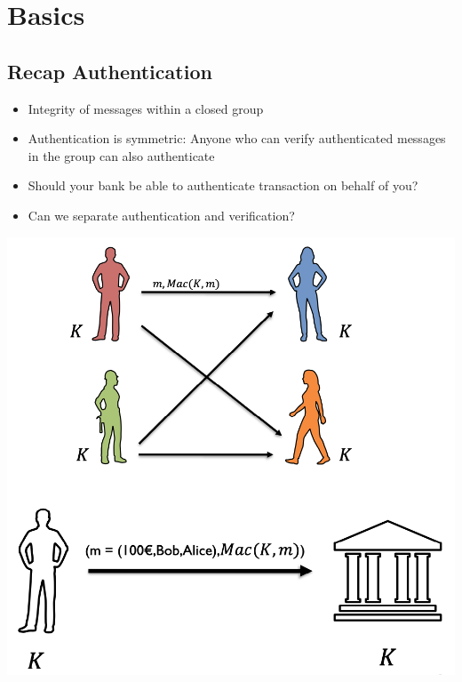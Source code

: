 

\chapter{Basics}

\section{Recap Authentication}
    \begin{itemize}
        \item Integrity of messages within a closed group
        \item Authentication is symmetric: Anyone who can verify authenticated messages in the group can also authenticate
        \item Should your bank be able to authenticate transaction on behalf of you?
        \item Can we separate authentication and verification?
    \end{itemize}
    \begin{center}
	    \includegraphics[width=140mm]{Graphics/Digital Signatures/ds1.png}
    \end{center}

